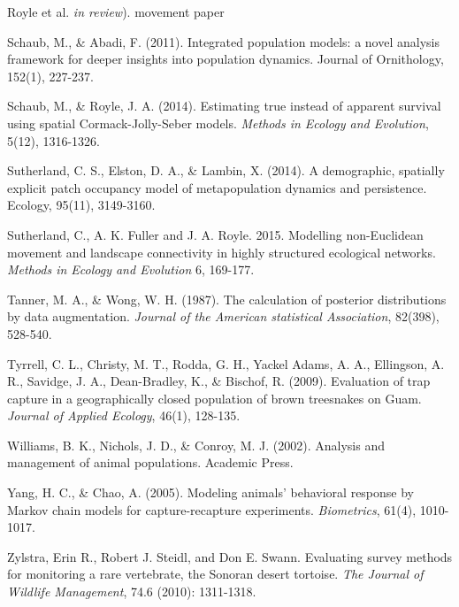 \documentclass{book}
\begin{document}
\rf Royle et al. {\it in review}).  movement paper

Schaub, M., \& Abadi, F. (2011). Integrated population models: a novel analysis framework for deeper insights into population dynamics. Journal of Ornithology, 152(1), 227-237.

\rf Schaub, M., \& Royle, J. A. (2014). Estimating true instead of apparent survival using spatial Cormack-Jolly-Seber models. \textit{Methods in Ecology and Evolution}, 5(12), 1316-1326.

\rf Sutherland, C. S., Elston, D. A., \& Lambin, X. (2014). A demographic, spatially explicit patch occupancy model of metapopulation dynamics and persistence. Ecology, 95(11), 3149-3160.

\rf Sutherland, C., A. K. Fuller and J. A. Royle. 2015. Modelling non-Euclidean movement and landscape connectivity in highly structured ecological networks. {\it Methods in Ecology and Evolution}  6, 169-177.

\rf Tanner, M. A., \& Wong, W. H. (1987). The calculation of posterior distributions by data augmentation. \textit{Journal of the American statistical Association}, 82(398), 528-540.

\rf Tyrrell, C. L., Christy, M. T., Rodda, G. H., Yackel Adams, A. A., Ellingson, A. R., Savidge, J. A., Dean-Bradley, K., \& Bischof, R. (2009). Evaluation of trap capture in a geographically closed population of brown treesnakes on Guam. \textit{Journal of Applied Ecology}, 46(1), 128-135.

\rf Williams, B. K., Nichols, J. D., \& Conroy, M. J. (2002). Analysis and management of animal populations. Academic Press.

\rf Yang, H. C., \& Chao, A. (2005). Modeling animals' behavioral response by Markov chain models for capture-recapture experiments. \textit{Biometrics}, 61(4), 1010-1017.

\rf Zylstra, Erin R., Robert J. Steidl, and Don E. Swann. Evaluating survey methods for monitoring a rare vertebrate, the Sonoran desert tortoise. \textit{The Journal of Wildlife Management}, 74.6 (2010): 1311-1318.
\end{document}
